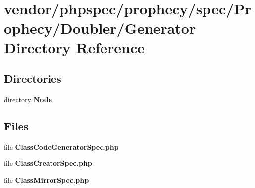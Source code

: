 \section{vendor/phpspec/prophecy/spec/\+Prophecy/\+Doubler/\+Generator Directory Reference}
\label{dir_2deb67e4c54adb7e85063272fee78a5b}
\subsection*{Directories}
\begin{DoxyCompactItemize}
\item 
directory {\bf Node}
\end{DoxyCompactItemize}
\subsection*{Files}
\begin{DoxyCompactItemize}
\item 
file {\bf Class\+Code\+Generator\+Spec.\+php}
\item 
file {\bf Class\+Creator\+Spec.\+php}
\item 
file {\bf Class\+Mirror\+Spec.\+php}
\end{DoxyCompactItemize}
